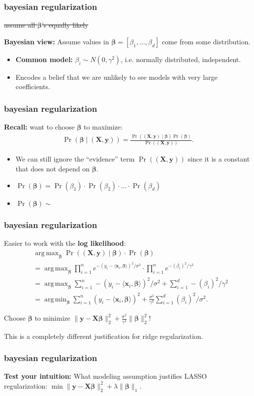 \documentclass[handout,compress]{beamer}
\newcommand{\bs}[1]{\boldsymbol{#1}}
\newcommand{\bv}[1]{\mathbf{#1}}
\DeclareMathOperator*{\argmin}{arg\,min}
\DeclareMathOperator*{\argmax}{arg\,max}
\begin{document}
\begin{frame}
	\frametitle{bayesian regularization}
	\begin{center}
	\sout{assume all $\bs{\beta}$'s equally likely}	
	
	\textbf{Bayesian view:} Assume values in $\bs{\beta} = [\beta_1, \ldots, \beta_d]$ come from some distribution. 
	\end{center}

\begin{itemize}
	\item \textbf{Common model:} $\beta_i \sim N(0,\gamma^2)$, i.e. normally distributed, independent.
	\item Encodes a belief that we are unlikely to see models with very large coefficients. 
\end{itemize}
\end{frame}

\begin{frame}
	\frametitle{bayesian regularization}
	\textbf{Recall:}  want to choose $\bs{\beta}$ to maximize:
	\begin{align*}
		\Pr(\bs{\beta} \mid (\bv{X},\bv{y}) )  = \frac{\Pr((\bv{X},\bv{y}) \mid  \bs{\beta} ) \Pr(\bs{\beta} )  }{\Pr((\bv{X},\bv{y}) )} .
	\end{align*}
	\begin{itemize}
	\item We can still ignore the ``evidence'' term $\Pr((\bv{X},\bv{y}))$ since it is a constant that does not depend on $\bs{\beta}$.
	\item $\Pr(\bs{\beta}) = \Pr({\beta}_1)\cdot  \Pr({\beta}_2)\cdot \ldots \cdot \Pr({\beta}_d)$
	\item $\Pr(\bs{\beta})  \sim $
	\end{itemize}
\end{frame}

\begin{frame}
	\frametitle{bayesian regularization}
	Easier to work with the {\textbf{log likelihood}}:
	\begin{align*}
	&\argmax_{\bs{\beta}}\Pr((\bv{X},\bv{y}) \mid  \bs{\beta} ) \cdot \Pr(\bs{\beta} ) \\
	& = \argmax_{\bs{\beta}} \prod_{i=1}^n e^{-(y_i - \langle \bv{x}_i, \bs{\beta} \rangle)^2/\sigma^2} \cdot \prod_{i=1}^n e^{-(\beta_i)^2/\gamma^2} \\ 
	&= \argmax_{\bs{\beta}}  \sum_{i=1}^n -(y_i - \langle \bv{x}_i, \bs{\beta} \rangle)^2/\sigma^2 + \sum_{i=1}^d -(\beta_i)^2/\gamma^2\\
	&= \argmin_{\bs{\beta}}  \sum_{i=1}^n (y_i - \langle \bv{x}_i, \bs{\beta} \rangle)^2+ \frac{\sigma^2 }{\gamma^2}\sum_{i=1}^d (\beta_i)^2/\sigma^2.
	\end{align*}
	
	Choose $\bs{\beta}$ to minimize $\|\bv{y} - \bv{X}\bs{\beta}\|_2^2 + \frac{\sigma^2 }{\gamma^2}\|\bs{\beta}\|_2^2$!
	
	
	This is a completely different justification for ridge regularization. 
\end{frame}

\begin{frame}
	\frametitle{bayesian regularization}
	\textbf{Test your intuition:} What modeling assumption justifies LASSO regularization: $\min \|\bv{y} - \bv{X}\bs{\beta}\|_2^2 + \lambda\|\bs{\beta}\|_1$.
\end{frame}
\end{document}
